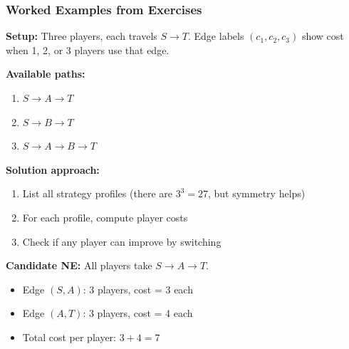 \bigseparator

\subsubsection{Worked Examples from Exercises}

\begin{exbox}
\begin{center}
\end{center}

\textbf{Setup:} Three players, each travels $S \to T$. Edge labels $(c_1, c_2, c_3)$ show cost when 1, 2, or 3 players use that edge.

\textbf{Available paths:}
\begin{enumerate}
  \item $S \to A \to T$
  \item $S \to B \to T$
  \item $S \to A \to B \to T$
\end{enumerate}

\textbf{Solution approach:}
\begin{enumerate}
  \item List all strategy profiles (there are $3^3 = 27$, but symmetry helps)
  \item For each profile, compute player costs
  \item Check if any player can improve by switching
\end{enumerate}

\textbf{Candidate NE:} All players take $S \to A \to T$.
\begin{itemize}
  \item Edge $(S,A)$: 3 players, cost = 3 each
  \item Edge $(A,T)$: 3 players, cost = 4 each
  \item Total cost per player: $3 + 4 = 7$
\end{itemize}


\end{exbox}
